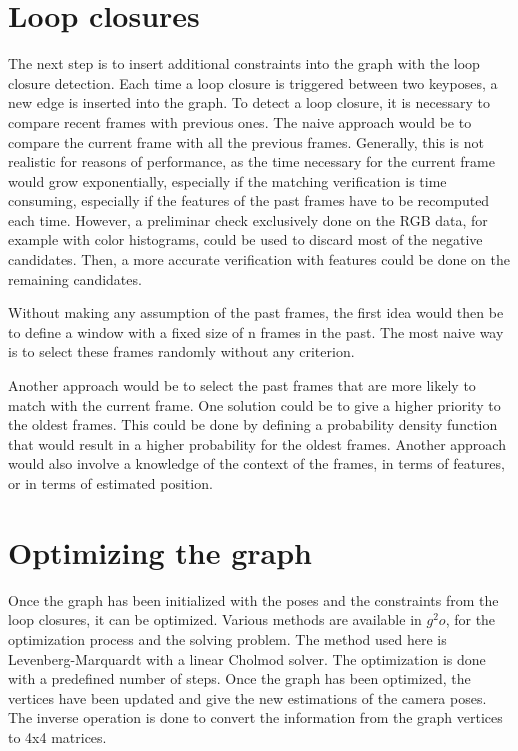 \section{Loop closures}

The next step is to insert additional constraints into the graph with the loop closure detection. Each time a loop closure is triggered between two keyposes, a new edge is inserted into the graph. To detect a loop closure, it is necessary to compare recent frames with previous ones. The naive approach would be to compare the current frame with all the previous frames. Generally, this is not realistic for reasons of performance, as the time necessary for the current frame would grow exponentially, especially if the matching verification is time consuming, especially if the features of the past frames have to be recomputed each time. However, a preliminar check exclusively done on the RGB data, for example with color histograms, could be used to discard most of the negative candidates. Then, a more accurate verification with features could be done on the remaining candidates.

Without making any assumption of the past frames, the first idea would then be to define a window with a fixed size of n frames in the past. The most naive way is to select these frames randomly without any criterion.

Another approach would be to select the past frames that are more likely to match with the current frame. One solution could be to give a higher priority to the oldest frames. This could be done by defining a probability density function that would result in a higher probability for the oldest frames. Another approach would also involve a knowledge of the context of the frames, in terms of features, or in terms of estimated position.


\section{Optimizing the graph}

Once the graph has been initialized with the poses and the constraints from the loop closures, it can be optimized. Various methods are available in $g^2o$, for the optimization process and the solving problem. The method used here is Levenberg-Marquardt with a linear Cholmod solver. The optimization is done with a predefined number of steps. Once the graph has been optimized, the vertices have been updated and give the new estimations of the camera poses. The inverse operation is done to convert the information from the graph vertices to 4x4 matrices.

